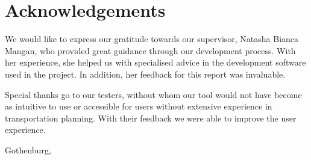 \thispagestyle{plain}
\section*{Acknowledgements}
    We would like to express our gratitude towards our supervisor, Natasha Bianca Mangan, who provided great guidance through our development process. With her experience, she helped us with specialised advice in the development software used in the project. In addition, her feedback for this report was invaluable.

    Special thanks go to our testers, without whom our tool would not have become as intuitive to use or accessible for users without extensive experience in transportation planning. With their feedback we were able to improve the user experience.

\vspace{1.5cm}
\hfill
\membertildelist{} Gothenburg, \monthname \space \the\year

\newpage

\thispagestyle{empty}
\mbox{}